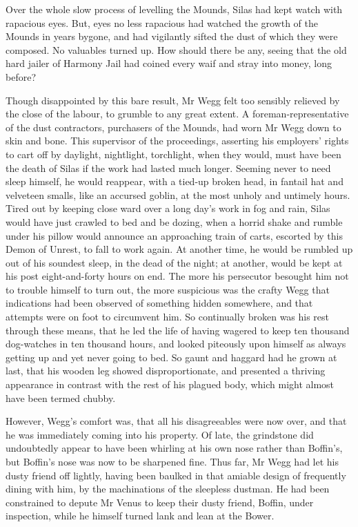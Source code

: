 Over the whole slow process of levelling the Mounds, Silas had kept
watch with rapacious eyes. But, eyes no less rapacious had watched the
growth of the Mounds in years bygone, and had vigilantly sifted the dust
of which they were composed. No valuables turned up. How should there
be any, seeing that the old hard jailer of Harmony Jail had coined every
waif and stray into money, long before?

Though disappointed by this bare result, Mr Wegg felt too sensibly
relieved by the close of the labour, to grumble to any great extent.
A foreman-representative of the dust contractors, purchasers of the
Mounds, had worn Mr Wegg down to skin and bone. This supervisor of the
proceedings, asserting his employers’ rights to cart off by daylight,
nightlight, torchlight, when they would, must have been the death of
Silas if the work had lasted much longer. Seeming never to need sleep
himself, he would reappear, with a tied-up broken head, in fantail hat
and velveteen smalls, like an accursed goblin, at the most unholy and
untimely hours. Tired out by keeping close ward over a long day’s work
in fog and rain, Silas would have just crawled to bed and be dozing,
when a horrid shake and rumble under his pillow would announce an
approaching train of carts, escorted by this Demon of Unrest, to fall to
work again. At another time, he would be rumbled up out of his soundest
sleep, in the dead of the night; at another, would be kept at his post
eight-and-forty hours on end. The more his persecutor besought him not
to trouble himself to turn out, the more suspicious was the crafty Wegg
that indications had been observed of something hidden somewhere, and
that attempts were on foot to circumvent him. So continually broken was
his rest through these means, that he led the life of having wagered
to keep ten thousand dog-watches in ten thousand hours, and looked
piteously upon himself as always getting up and yet never going to bed.
So gaunt and haggard had he grown at last, that his wooden leg showed
disproportionate, and presented a thriving appearance in contrast
with the rest of his plagued body, which might almost have been termed
chubby.

However, Wegg’s comfort was, that all his disagreeables were now over,
and that he was immediately coming into his property. Of late, the
grindstone did undoubtedly appear to have been whirling at his own nose
rather than Boffin’s, but Boffin’s nose was now to be sharpened fine.
Thus far, Mr Wegg had let his dusty friend off lightly, having been
baulked in that amiable design of frequently dining with him, by the
machinations of the sleepless dustman. He had been constrained to depute
Mr Venus to keep their dusty friend, Boffin, under inspection, while he
himself turned lank and lean at the Bower.

